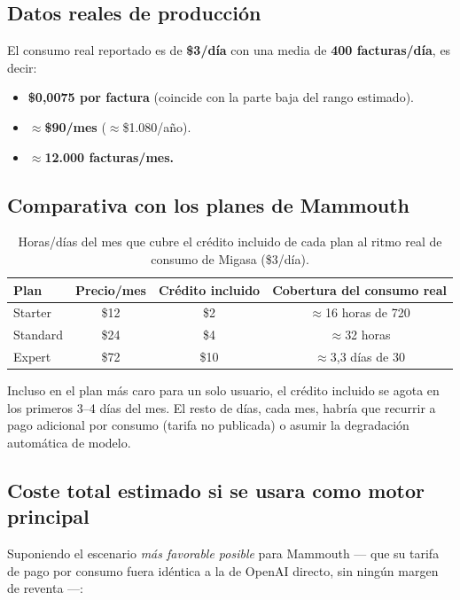 \documentclass[11pt,a4paper]{article}
\begin{document}
\subsection{Datos reales de producción}

El consumo real reportado es de \textbf{\$3/día} con una media de
\textbf{400 facturas/día}, es decir:

\begin{itemize}
    \item \textbf{\$0,0075 por factura} (coincide con la parte baja del rango estimado).
    \item \textbf{$\approx$\$90/mes} ($\approx$\$1.080/año).
    \item \textbf{$\approx$12.000 facturas/mes.}
\end{itemize}

\subsection{Comparativa con los planes de Mammouth}

\begin{table}[h]
\centering
\begin{tabular}{lccc}
\toprule
\textbf{Plan} & \textbf{Precio/mes} & \textbf{Crédito incluido} & \textbf{Cobertura del consumo real} \\
\midrule
Starter  & \$12 & \$2  & $\approx$16 horas de 720 \\
Standard & \$24 & \$4  & $\approx$32 horas \\
Expert   & \$72 & \$10 & $\approx$3,3 días de 30 \\
\bottomrule
\end{tabular}
\caption{Horas/días del mes que cubre el crédito incluido de cada plan al ritmo
real de consumo de Migasa (\$3/día).}
\end{table}

Incluso en el plan más caro para un solo usuario, el crédito incluido se agota en
los primeros 3--4 días del mes. El resto de días, cada mes, habría que recurrir a
pago adicional por consumo (tarifa no publicada) o asumir la degradación
automática de modelo.

\subsection{Coste total estimado si se usara como motor principal}

Suponiendo el escenario \emph{más favorable posible} para Mammouth --- que su
tarifa de pago por consumo fuera idéntica a la de OpenAI directo, sin ningún
margen de reventa ---:
\end{document}
